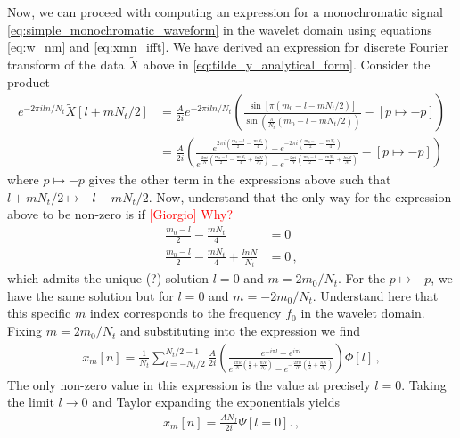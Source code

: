\documentclass{article}
\begin{document}
Now, we can proceed with computing an expression for a monochromatic signal \eqref{eq:simple_monochromatic_waveform} in the wavelet domain using equations \eqref{eq:w_nm} and \eqref{eq:xmn_ifft}. We have derived an expression for discrete Fourier transform of the data $\tilde{X}$ above in \eqref{eq:tilde_y_analytical_form}. Consider the product
\begin{align}
e^{-2\pi i ln/N_{t}}\tilde{X}[l + mN_{t}/2] &= \frac{A}{2i}e^{-2\pi i ln/N_{t}}\left(\frac{\sin[\pi(m_{0} - l - mN_{t}/2)]}{\sin\left(\frac{\pi}{N_{t}}(m_{0} - l - mN_{t}/2 )\right)} - [p \mapsto -p]\right) \nonumber\\
& = \frac{A}{2i}\left(\frac{e^{2\pi i \left(\frac{m_{0} - l}{2} - \frac{mN_{t}}{4}\right)} - e^{-2\pi i \left(\frac{m_{0} - l}{2} - \frac{mN_{t}}{4}\right)}}{e^{\frac{2\pi i}{N}\left(\frac{m_{0} - l}{2} - \frac{mN_{t}}{4} + \frac{lnN}{N_{t}}\right)} - e^{-\frac{2\pi i}{N}\left(\frac{m_{0} - l}{2} - \frac{mN_{t}}{4} + \frac{lnN}{N_{t}}\right)}} - [p \mapsto -p]\right)\nonumber
\end{align}
where $p \mapsto -p$ gives the other term in the expressions above such that $l + mN_{t}/2 \mapsto -l - mN_{t}/2$. Now, understand that the only way for the expression above to be non-zero is if \textcolor{red}{[Giorgio] Why?} 
\begin{align}
\frac{m_{0} - l}{2} - \frac{mN_{t}}{4} &= 0 \\
\frac{m_{0} - l}{2} - \frac{mN_{t}}{4} + \frac{lnN}{N_{t}} &= 0\,,
\end{align}
which admits the unique (?) solution $l = 0$ and $m = 2m_{0}/N_{t}$. For the $p\mapsto -p$, we have the same solution but for $l = 0$ and $m = -2m_{0}/N_{t}$. Understand here that this specific $m$ index corresponds to the frequency $f_{0}$ in the wavelet domain. Fixing $m = 2m_{0}/N_{t}$ and substituting into the expression we find 
\begin{align}
x_{m}[n] = \frac{1}{N_{t}} \sum_{l = -N_{t}/2}^{N_{t}/2 - 1} \frac{A}{2i}\left(\frac{e^{-i\pi l} - e^{i\pi l}}{e^{\frac{2\pi i l}{N}\left(\frac{1}{2} + \frac{nN}{N_{t}}\right)} - e^{-\frac{2\pi i l}{N}\left(\frac{1}{2} + \frac{nN}{N_{t}}\right)}}\right) \Phi[l] \,,
\end{align}
The only non-zero value in this expression is the value at precisely $l = 0$. Taking the limit $l \rightarrow 0$ and Taylor expanding the exponentials yields
\begin{align}\label{eq:x_mn_monochromatic_Psi}
x_{m}[n] = \frac{A N_{f}}{2i} \Psi[l = 0]. \,,
\end{align}
\end{document}
